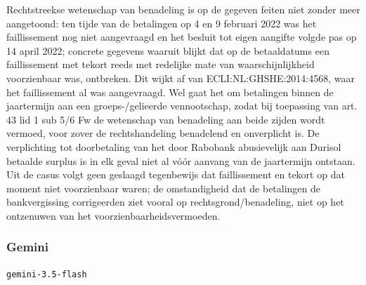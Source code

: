 \documentclass[
  dutch,
  a4paper,
]{article}
\begin{document}
Rechtstreekse wetenschap van benadeling is op de gegeven feiten niet zonder meer aangetoond: ten tijde van de betalingen op 4 en 9 februari 2022 was het faillissement nog niet aangevraagd en het besluit tot eigen aangifte volgde pas op 14 april 2022; concrete gegevens waaruit blijkt dat op de betaaldatums een faillissement met tekort reeds met redelijke mate van waarschijnlijkheid voorzienbaar was, ontbreken. Dit wijkt af van ECLI:NL:GHSHE:2014:4568, waar het faillissement al was aangevraagd. Wel gaat het om betalingen binnen de jaartermijn aan een groeps-/gelieerde vennootschap, zodat bij toepassing van art. 43 lid 1 sub 5/6 Fw de wetenschap van benadeling aan beide zijden wordt vermoed, voor zover de rechtshandeling benadelend en onverplicht is. De verplichting tot doorbetaling van het door Rabobank abusievelijk aan Durisol betaalde surplus is in elk geval niet al vóór aanvang van de jaartermijn ontstaan. Uit de casus volgt geen geslaagd tegenbewijs dat faillissement en tekort op dat moment niet voorzienbaar waren; de omstandigheid dat de betalingen de bankvergissing corrigeerden ziet vooral op rechtsgrond/benadeling, niet op het ontzenuwen van het voorzienbaarheidsvermoeden.

\newpage


\subsubsection{Gemini}\label{gemini-4}

\texttt{gemini-3.5-flash}
\end{document}
